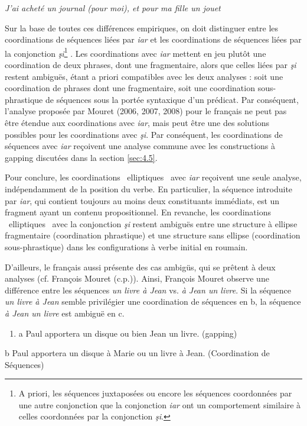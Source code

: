 {\itshape
J'ai acheté un journal (pour moi), et pour ma fille un jouet}

Sur la base de toutes ces différences empiriques, on doit distinguer entre les coordinations de séquences liées par \textit{iar} et les coordinations de séquences liées par la conjonction \textit{şi}\footnote{A priori, les séquences juxtaposées ou encore les séquences coordonnées par une autre conjonction que la conjonction \textit{iar} ont un comportement similaire à celles coordonnées par la conjonction \textit{şi}.} . Les coordinations avec \textit{iar} mettent en jeu plutôt une coordination de deux phrases, dont une fragmentaire, alors que celles liées par \textit{şi} restent ambiguës, étant a priori compatibles avec les deux analyses : soit une coordination de phrases dont une fragmentaire, soit une coordination sous-phrastique de séquences sous la portée syntaxique d'un prédicat. Par conséquent, l'analyse proposée par Mouret (2006, 2007, 2008) pour le français ne peut pas être étendue aux coordinations avec \textit{iar}, mais peut être une des solutions possibles pour les coordinations avec \textit{şi}. Par conséquent, les coordinations de séquences avec \textit{iar} reçoivent une analyse commune avec les constructions à gapping discutées dans la section \ref{sec:4.5}. 

Pour conclure, les coordinations {\guillemotleft}~elliptiques~{\guillemotright} avec \textit{iar} reçoivent une seule analyse, indépendamment de la position du verbe. En particulier, la séquence introduite par \textit{iar}, qui contient toujours au moins deux constituants immédiats, est un fragment ayant un contenu propositionnel. En revanche, les coordinations {\guillemotleft}~elliptiques~{\guillemotright} avec la conjonction \textit{şi} restent ambiguës entre une structure à ellipse fragmentaire (coordination phrastique) et une structure sans ellipse (coordination sous-phrastique) dans les configurations à verbe initial en roumain.

D'ailleurs, le français aussi présente des cas ambigüs, qui se prêtent à deux analyses (cf. François Mouret (c.p.)). Ainsi, François Mouret observe une différence entre les séquences \textit{un livre à Jean} vs. \textit{à Jean un livre}. Si la séquence \textit{un livre à Jean} semble privilégier une coordination de séquences en b, la séquence \textit{à Jean un livre} est ambiguë en c.


\begin{enumerate}
\item \label{bkm:Ref290364017}a   Paul apportera un disque ou bien Jean un livre. (gapping)


\end{enumerate}
  b  Paul apportera un disque à Marie ou un livre à Jean. (Coordination de Séquences)

